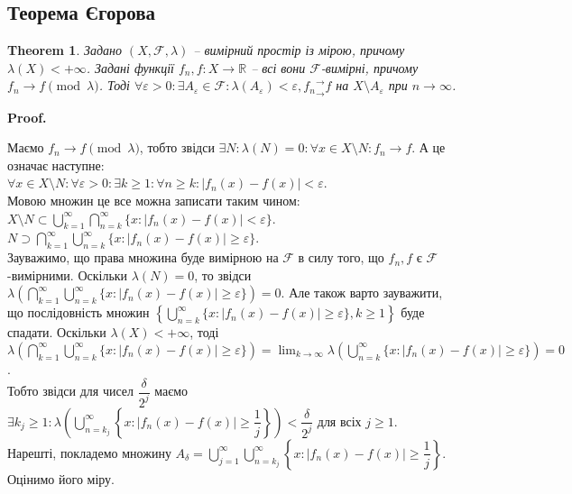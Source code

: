 \documentclass[a4paper, 10pt]{article}
\makeatletter
\theoremstyle{theoremdd}
\newtheorem{theorem}{Theorem}[subsection]
\renewenvironment{proof}[1][Proof.\\]{\par
\pushQED{\hfill \qed}%
\normalfont \topsep6\p@\@plus6\p@\relax
\trivlist
\item\relax
{\bfseries
#1\@addpunct{.}}\hspace\labelsep\ignorespaces
}{%
\popQED\endtrivlist\@endpefalse
}
\makeatother
\begin{document}
\subsection{Теорема Єгорова}
\begin{theorem}
Задано $(X,\mathcal{F},\lambda)$ -- вимірний простір із мірою, причому $\lambda(X) < +\infty$. Задані функції $f_n,f \colon X \to \mathbb{R}$ -- всі вони $\mathcal{F}$-вимірні, причому $f_n \to f \pmod \lambda$. Тоді $\forall \varepsilon > 0: \exists A_\varepsilon \in \mathcal{F}: \lambda(A_\varepsilon) < \varepsilon, {f_n}^\rightarrow_\rightarrow f$ на $X \setminus A_\varepsilon$ при $n \to \infty$.
\end{theorem}

\begin{proof}
Маємо $f_n \to f \pmod \lambda$, тобто звідси $\exists N: \lambda(N) = 0: \forall x \in X \setminus N: f_n \to f$. А це означає наступне:\\
$\forall x \in X \setminus N: \forall \varepsilon > 0: \exists k \geq 1: \forall n \geq k: |f_n(x)-f(x)| < \varepsilon$.\\
Мовою множин це все можна записати таким чином:\\
$X \setminus N \subset \displaystyle\bigcup_{k=1}^\infty \bigcap_{n = k}^\infty \{x : |f_n(x)-f(x)| < \varepsilon\}$.\\
$\displaystyle N \supset \bigcap_{k=1}^\infty \bigcup_{n = k}^\infty \{x : |f_n(x)-f(x)| \geq \varepsilon\}$.\\
Зауважимо, що права множина буде вимірною на $\mathcal{F}$ в силу того, що $f_n,f$ є $\mathcal{F}$-вимірними. Оскільки $\lambda(N) = 0$, то звідси $\displaystyle\lambda\left( \bigcap_{k=1}^\infty \bigcup_{n = k}^\infty \{x : |f_n(x)-f(x)| \geq \varepsilon\} \right) = 0$. Але також варто зауважити, що послідовність множин $\displaystyle\left\{ \bigcup_{n = k}^\infty \{x : |f_n(x)-f(x)| \geq \varepsilon\}, k \geq 1 \right\}$ буде спадати. Оскільки $\lambda(X) < +\infty$, тоді $\displaystyle\lambda\left( \bigcap_{k=1}^\infty \bigcup_{n = k}^\infty \{x : |f_n(x)-f(x)| \geq \varepsilon\} \right) = \lim_{k \to \infty} \lambda\left( \bigcup_{n=k}^\infty \{x: |f_n(x)-f(x)| \geq \varepsilon\} \right) = 0$.\\
Тобто звідси для чисел $\dfrac{\delta}{2^j}$ маємо $\displaystyle\exists k_j \geq 1: \lambda\left( \bigcup_{n=k_j}^\infty \left\{x : |f_n(x)-f(x)| \geq \dfrac{1}{j}\right\} \right) < \dfrac{\delta}{2^j}$ для всіх $j \geq 1$.\\
Нарешті, покладемо множину $A_\delta = \displaystyle\bigcup_{j=1}^\infty \bigcup_{n=k_j}^\infty \left\{x : |f_n(x)-f(x)| \geq \dfrac{1}{j} \right\}$. Оцінимо його міру.\\

\end{proof}
\end{document}
